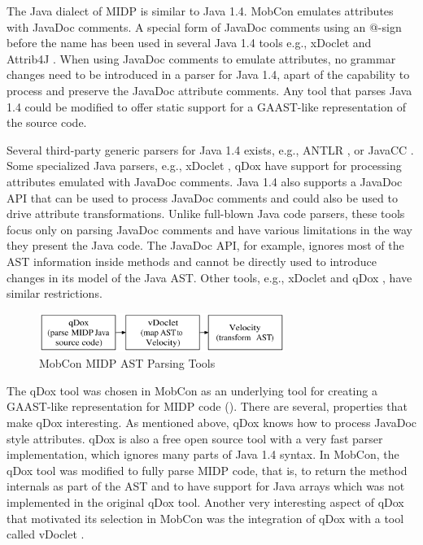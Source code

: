 The Java dialect of MIDP is similar to Java 1.4. MobCon emulates attributes with JavaDoc \cite{jw-pollac} comments. A special form of JavaDoc comments using an @-sign before the name has been used in several Java 1.4 tools e.g., xDoclet \cite{www.xDoclet} and Attrib4J \cite{java.attrib4j}. When using JavaDoc comments to emulate attributes, no grammar changes need to be introduced in a parser for Java 1.4, apart of the capability to process and preserve the JavaDoc attribute comments. Any tool that parses Java 1.4 could be modified to offer static support for a GAAST-like representation of the source code.

Several third-party generic parsers for Java 1.4 exists, e.g., ANTLR \cite{antlr}, or JavaCC \cite{javacc}. Some specialized Java parsers, e.g., xDoclet \cite{www.xDoclet}, qDox \cite{qdox} have support for processing attributes emulated with JavaDoc comments. Java 1.4 also supports a JavaDoc API that can be used to process JavaDoc comments and could also be used to drive attribute transformations. Unlike full-blown Java code parsers, these tools focus only on parsing  JavaDoc comments and have various limitations in the way they present the Java code. The JavaDoc API, for example, ignores most of the AST information inside methods and cannot be directly used to introduce changes in its model of the Java AST. Other tools, e.g., xDoclet \cite{www.xDoclet} and qDox \cite{qdox}, have similar restrictions. 

\begin{figure}[ht]
	\begin{center}
		\includegraphics[width=8cm,height=!]{ch05/mobcon-gaast}
	\end{center}
	\caption{MobCon MIDP AST Parsing Tools}
	\label{fig:mc-gaast}
\end{figure}

The qDox \cite{qdox} tool was chosen in MobCon as an underlying tool for creating a GAAST-like representation for MIDP code (). There are several, properties that make qDox interesting. As mentioned above, qDox knows how to process JavaDoc style attributes. qDox is also a free open source tool with a very fast parser implementation, which ignores many parts of Java 1.4 syntax. In MobCon, the qDox tool was modified to fully parse MIDP code, that is, to return the method internals as part of the AST and to have support for Java arrays which was not implemented in the original qDox tool. Another very interesting aspect of qDox that motivated its selection in MobCon was the integration of qDox with a tool called vDoclet \cite{vdoclet}. 


